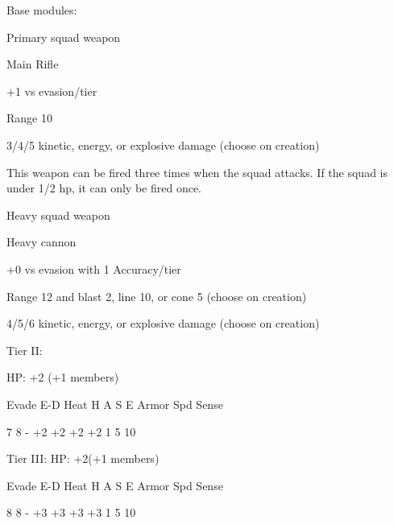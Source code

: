 Base modules:

Primary squad weapon

Main Rifle

+1 vs evasion/tier





Range 10

3/4/5 kinetic, energy, or explosive damage (choose on creation)

This weapon can be fired three times when the squad attacks. If the squad is under 1/2 hp, it can
only be fired once.


Heavy squad weapon

Heavy cannon

+0 vs evasion with 1 Accuracy/tier

Range 12 and blast 2, line 10, or cone 5 (choose on creation)

4/5/6 kinetic, energy, or explosive damage (choose on creation)


Tier II:

HP: +2 (+1 members)


          Evade    E-D    Heat    H    A     S    E       Armor        Spd      Sense

          7        8      -       +2   +2    +2   +2       1           5        10

Tier III:
HP: +2(+1 members)


          Evade    E-D    Heat    H    A     S    E       Armor        Spd      Sense

         8         8      -       +3   +3    +3   +3       1           5        10

